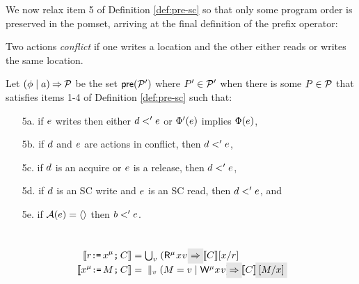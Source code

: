 We now relax item 5 of Definition \ref{def:pre-sc} so that only some program
order is {preserved} in the pomset, arriving at the final definition of
the prefix operator: %
\begin{definition}
  \label{def:prefix}
Two actions \emph{conflict} if one writes a location and the other
either reads or writes the same location.

Let $(\phi \mid a) \mathbin\Rightarrow \mathcal{P}$ be the set $\mathsf{pre}(\mathcal{P}')$ where
$P'\in\mathcal{P}'$ when
there is some $P\in\mathcal{P}$ that satisfies items 1-4 of
Definition \ref{def:pre-sc} such that:
\begin{enumerate}
\item[5a.] %
  if $e$ writes then either $d<'e$ or $\Phi'(e)$ implies $\Phi(e)$,
\item[5b.] if $d$ and $e$ are \external actions in conflict,
    then $d<'e$, %
\item[5c.] if $d$ is an acquire or $e$ is a release, then $d <' e$, 
\item[5d.] if $d$ is an SC write and $e$ is an SC read, then $d <' e$, and
\item[5e.] if $\mathcal{A}(e)=\langle\rangle$ then $b<'e$.
\end{enumerate}
\end{definition}
\vspace{-2ex}
\begin{candidate}\ \vspace{-1ex}
  \label{cand:sc}
    \begin{align*}
    \sem{\aReg\GETS\aLoc^\amode\SEMI \aCmd} & =
    \textstyle\bigcup_\aVal\; (\DRmode\aLoc\aVal) \mathhl{\prefix}\; \sem{\aCmd} [\aLoc/\aReg] 
    \\
    \sem{\aLoc^\amode\GETS\aExp\SEMI \aCmd} & =
    \;\;\textstyle\parallel_\aVal (\aExp=\aVal \mid \DWmode\aLoc\aVal) \mathhl{\prefix}\; \sem{\aCmd}\mkern3.5mu\mathhl{[\aExp/\aLoc]}
  \end{align*}
\end{candidate}
